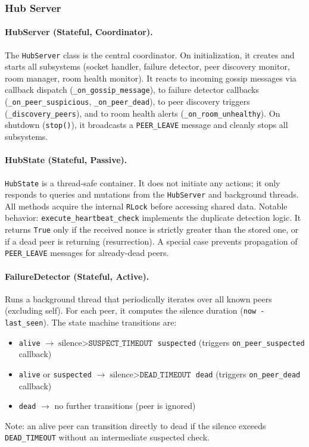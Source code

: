 \subsubsection{Hub Server}

\paragraph{HubServer (Stateful, Coordinator).}
The \texttt{HubServer} class is the central coordinator.
On initialization, it creates and starts all subsystems (socket handler, failure detector, peer discovery monitor, room manager, room health monitor).
It reacts to incoming gossip messages via callback dispatch (\texttt{\_on\_gossip\_message}), to failure detector callbacks (\texttt{\_on\_peer\_suspicious}, \texttt{\_on\_peer\_dead}), to peer discovery triggers (\texttt{\_discovery\_peers}), and to room health alerts (\texttt{\_on\_room\_unhealthy}).
On shutdown (\texttt{stop()}), it broadcasts a \texttt{PEER\_LEAVE} message and cleanly stops all subsystems.

\paragraph{HubState (Stateful, Passive).}
\texttt{HubState} is a thread-safe container.
It does not initiate any actions; it only responds to queries and mutations from the \texttt{HubServer} and background threads.
All methods acquire the internal \texttt{RLock} before accessing shared data.
Notable behavior: \texttt{execute\_heartbeat\_check} implements the duplicate detection logic. It returns \texttt{True} only if the received nonce is strictly greater than the stored one, or if a dead peer is returning (resurrection).
A special case prevents propagation of \texttt{PEER\_LEAVE} messages for already-dead peers.

\paragraph{FailureDetector (Stateful, Active).}
Runs a background thread that periodically iterates over all known peers (excluding self).
For each peer, it computes the silence duration (\texttt{now - last\_seen}).
The state machine transitions are:
\begin{itemize}
  \item \texttt{alive} $\rightarrow{\text{silence} > \texttt{SUSPECT\_TIMEOUT}}$ \texttt{suspected} (triggers \texttt{on\_peer\_suspected} callback)
  \item \texttt{alive} or \texttt{suspected} $\rightarrow{\text{silence} > \texttt{DEAD\_TIMEOUT}}$ \texttt{dead} (triggers \texttt{on\_peer\_dead} callback)
  \item \texttt{dead} $\rightarrow$ no further transitions (peer is ignored)
\end{itemize}
Note: an alive peer can transition directly to dead if the silence exceeds \texttt{DEAD\_TIMEOUT} without an intermediate suspected check.

